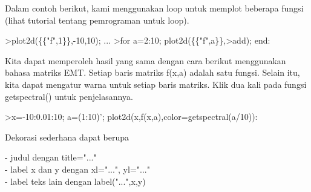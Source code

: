 \documentclass[a4paper,10pt]{article}
\begin{document}
\begin{eulernotebook}
\begin{eulercomment}
\begin{eulercomment}
\begin{eulercomment}
\begin{eulercomment}
\begin{eulercomment}
\begin{eulercomment}
\begin{eulercomment}
\begin{eulercomment}
\begin{eulercomment}
\begin{eulercomment}
\begin{eulercomment}
\begin{eulercomment}
\begin{eulercomment}
Dalam contoh berikut, kami menggunakan loop untuk memplot beberapa
fungsi (lihat tutorial tentang pemrograman untuk loop).
\end{eulercomment}
\begin{eulerprompt}
>plot2d(\{\{"f",1\}\},-10,10); ...
>for a=2:10; plot2d(\{\{"f",a\}\},>add); end:
\end{eulerprompt}
\begin{eulercomment}
Kita dapat memperoleh hasil yang sama dengan cara berikut menggunakan
bahasa matriks EMT. Setiap baris matriks f(x,a) adalah satu fungsi.
Selain itu, kita dapat mengatur warna untuk setiap baris matriks. Klik
dua kali pada fungsi getspectral() untuk penjelasannya.
\end{eulercomment}
\begin{eulerprompt}
>x=-10:0.01:10; a=(1:10)'; plot2d(x,f(x,a),color=getspectral(a/10)):
\end{eulerprompt}
\begin{eulercomment}
Dekorasi sederhana dapat berupa

- judul dengan title="..."\\
- label x dan y dengan xl="...", yl="..."\\
- label teks lain dengan label("...",x,y)


\end{eulercomment}
\end{eulercomment}
\end{eulercomment}
\end{eulercomment}
\end{eulercomment}
\end{eulercomment}
\end{eulercomment}
\end{eulercomment}
\end{eulercomment}
\end{eulercomment}
\end{eulercomment}
\end{eulercomment}
\end{eulercomment}
\end{eulernotebook}
\end{document}
